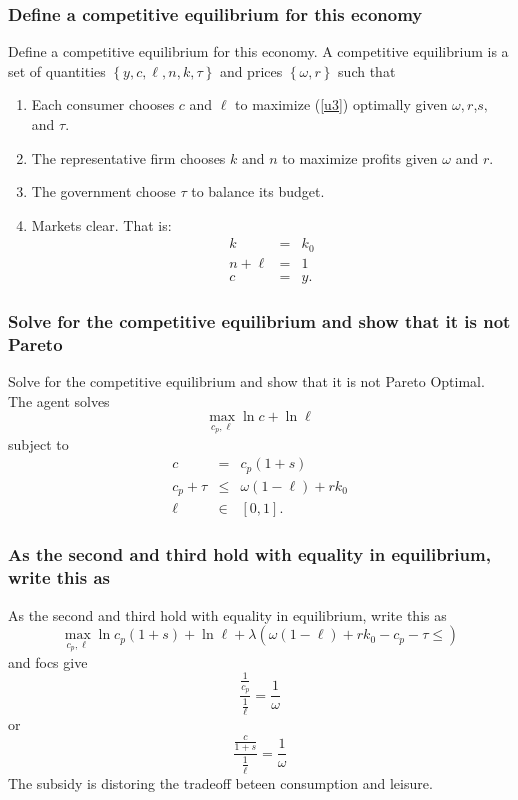 \documentclass[aspectratio=169]{ltx-talk}
\begin{document}
\begin{frame}
\frametitle{Define a competitive equilibrium for this economy}
Define a competitive equilibrium for this economy.\newline
A competitive equilibrium is a set of quantities $\left\{ y,c,\ell ,n,k,\tau
\right\} $ and prices $\left\{ \omega ,r\right\} $ such that

\begin{enumerate}
\item Each consumer chooses $c$ and $\ell $ to maximize (\ref{u3}) optimally
given $\omega ,r$,$s,$ and $\tau $.

\item The representative firm chooses $k$ and $n$ to maximize profits given $%
\omega $ and $r.$

\item The government choose $\tau $ to balance its budget.

\item Markets clear. That is:%
\begin{eqnarray*}
k &=&k_{0} \\
n+\ell &=&1 \\
c &=&y.
\end{eqnarray*}
\end{enumerate}
\end{frame}

\begin{frame}
\frametitle{Solve for the competitive equilibrium and show that it is not Pareto}
Solve for the competitive equilibrium and show that it is not Pareto
Optimal. The agent solves%
\begin{equation*}
\underset{c_{p},\ell }{\max }\ln c+\ln \ell
\end{equation*}%
subject to%
\begin{eqnarray*}
c &=&c_{p}\left( 1+s\right) \\
c_{p}+\tau &\leq &\omega \left( 1-\ell \right) +rk_{0} \\
\ell &\in &\left[ 0,1\right] .
\end{eqnarray*}%
\end{frame}

\begin{frame}
\frametitle{As the second and third hold with equality in equilibrium, write this as}
As the second and third hold with equality in equilibrium, write this as%
\begin{equation*}
\underset{c_{p},\ell }{\max }\ln c_{p}\left( 1+s\right) +\ln \ell +\lambda
\left( \omega \left( 1-\ell \right) +rk_{0}-c_{p}-\tau \leq \right)
\end{equation*}%
and focs give 
\begin{equation*}
\frac{\frac{1}{c_{p}}}{\frac{1}{\ell }}=\frac{1}{\omega }
\end{equation*}%
or%
\begin{equation*}
\frac{\frac{c}{1+s}}{\frac{1}{\ell }}=\frac{1}{\omega }
\end{equation*}%
The subsidy is distoring the tradeoff beteen consumption and leisure.
\end{frame}
\end{document}
